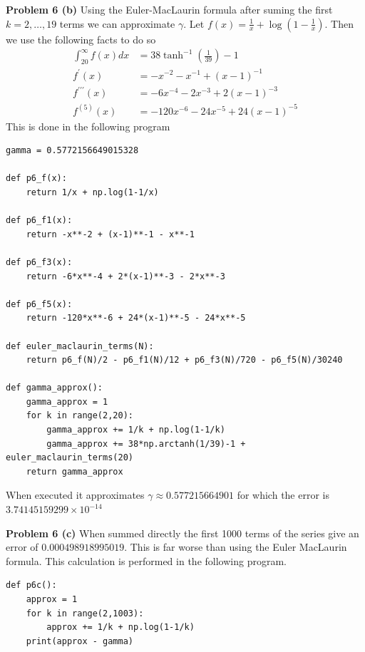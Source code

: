 \documentclass[12pt]{article}
\newcommand{\problem}[1]{\hspace{-4 ex} \large \textbf{Problem #1} }
\begin{document}
\bigbreak
\problem{6 (b)} Using the Euler-MacLaurin formula after suming the first $k=2, \dots,19$ terms we can approximate $\gamma$. Let $f(x) = \frac{1}{x} + \log(1-\tfrac{1}{x})$. Then we use the following facts to do so
\begin{align*}
	\int_{20}^\infty f(x) dx & = 38\tanh^{-1}(\tfrac{1}{39}) -1 \\
	f^\prime(x) & = -x^{-2} - x^{-1} + (x-1)^{-1} \\
	f^{\prime\prime\prime}(x) & = -6x^{-4} - 2x^{-3} + 2(x-1)^{-3} \\
	f^{(5)}(x) & = -120x^{-6} - 24x^{-5} + 24(x-1)^{-5}
\end{align*}
This is done in the following program
\begin{lstlisting}
gamma = 0.5772156649015328

def p6_f(x):
	return 1/x + np.log(1-1/x)
	
def p6_f1(x):
	return -x**-2 + (x-1)**-1 - x**-1
	
def p6_f3(x):
	return -6*x**-4 + 2*(x-1)**-3 - 2*x**-3
	
def p6_f5(x):
	return -120*x**-6 + 24*(x-1)**-5 - 24*x**-5
	
def euler_maclaurin_terms(N):
	return p6_f(N)/2 - p6_f1(N)/12 + p6_f3(N)/720 - p6_f5(N)/30240

def gamma_approx():
	gamma_approx = 1
	for k in range(2,20):
		gamma_approx += 1/k + np.log(1-1/k)
		gamma_approx += 38*np.arctanh(1/39)-1 + euler_maclaurin_terms(20)
	return gamma_approx
\end{lstlisting}

When executed it approximates $\gamma \approx 0.577215664901$ for which the error is $3.74145159299 \times 10^{-14}$

\bigbreak
\problem{6 (c)} When summed directly the first 1000 terms of the series give an error of $0.000498918995019$. This is far worse than using the Euler MacLaurin formula. This calculation is performed in the following program.

\begin{lstlisting}
def p6c():
	approx = 1
	for k in range(2,1003):
		approx += 1/k + np.log(1-1/k)
	print(approx - gamma)
\end{lstlisting}
\end{document}

